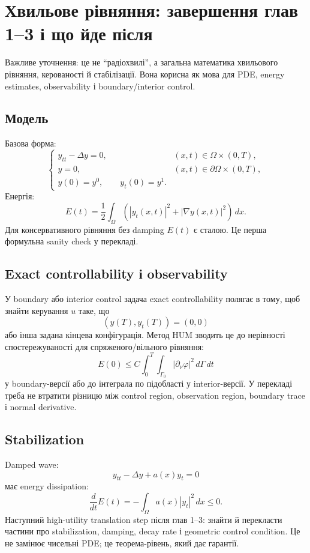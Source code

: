 \chapter{Хвильове рівняння: завершення глав 1--3 і що йде після}

Важливе уточнення: це не ``радіохвилі'', а загальна математика хвильового рівняння, керованості й стабілізації. Вона корисна як мова для PDE, energy estimates, observability і boundary/interior control.

\section*{Модель}

Базова форма:
\[
\begin{cases}
  y_{tt}-\Delta y = 0, & (x,t)\in \Omega\times(0,T),\\
  y=0, & (x,t)\in \partial\Omega\times(0,T),\\
  y(0)=y^0,
  \qquad y_t(0)=y^1.
\end{cases}
\]
Енергія:
\[
  E(t)=\frac12\int_\Omega\left(|y_t(x,t)|^2+|\nabla y(x,t)|^2\right)\,dx.
\]
Для консервативного рівняння без damping $E(t)$ є сталою. Це перша формульна sanity check у перекладі.

\section*{Exact controllability і observability}

У boundary або interior control задача exact controllability полягає в тому, щоб знайти керування $u$ таке, що
\[
  (y(T),y_t(T))=(0,0)
\]
або інша задана кінцева конфігурація. Метод HUM зводить це до нерівності спостережуваності для спряженого/вільного рівняння:
\[
  E(0) \le C\int_0^T\int_{\Gamma_0}|\partial_\nu \varphi|^2\,d\Gamma\,dt
\]
у boundary-версії або до інтеграла по підобласті у interior-версії. У перекладі треба не втратити різницю між control region, observation region, boundary trace і normal derivative.

\section*{Stabilization}

Damped wave:
\[
  y_{tt}-\Delta y+a(x)y_t=0
\]
має energy dissipation:
\[
  \frac{d}{dt}E(t)=-\int_\Omega a(x)|y_t|^2\,dx \le 0.
\]
Наступний high-utility translation step після глав 1--3: знайти й перекласти частини про stabilization, damping, decay rate і geometric control condition. Це не замінює чисельні PDE; це теорема-рівень, який дає гарантії.

